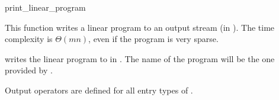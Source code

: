 \begin{ccRefFunction}{print_linear_program}


This function writes a linear program to an output stream (in 
). The time
complexity is $\Theta (mn)$, even if the program is very sparse.

{writes the linear program  to  in 
. The name of the program will be the one provided 
by .}

Output operators are defined for all entry types of .

\end{ccRefFunction}
